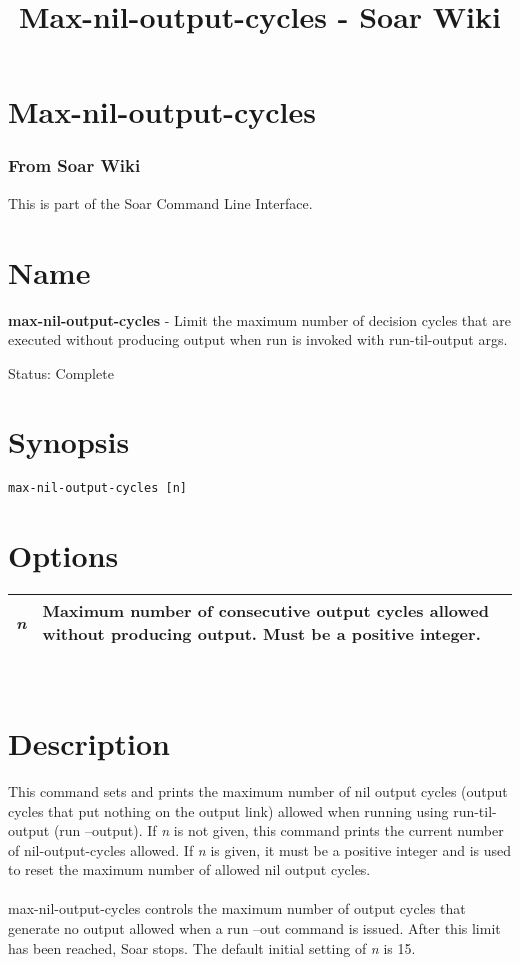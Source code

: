 \documentclass[10pt]{article}
\title{Max-nil-output-cycles - Soar Wiki}
\begin{document}
\section*{Max-nil-output-cycles}
\subsubsection*{From Soar Wiki}


 This is part of the Soar Command Line Interface. 
\section*{ Name }


 \textbf{max-nil-output-cycles}
 - Limit the maximum number of decision cycles that are executed without producing output when run is invoked with run-til-output args. 


 Status: Complete
\section*{ Synopsis }
\begin{verbatim}
max-nil-output-cycles [n]

\end{verbatim}
\section*{ Options }


\begin{tabular}{|p{1in}|p{5in}|}
\hline 
\emph{n}
 & Maximum number of consecutive output cycles allowed without producing output. Must be a positive integer.  \\
 \hline 

\end{tabular}



 \\ 

\section*{ Description }


 This command sets and prints the maximum number of nil output cycles (output cycles that put nothing on the output link) allowed when running using run-til-output (run --output). If \emph{n}
 is not given, this command prints the current number of nil-output-cycles allowed. If \emph{n}
 is given, it must be a positive integer and is used to reset the maximum number of allowed nil output cycles. \\ 
\\ 
max-nil-output-cycles controls the maximum number of output cycles that generate no output allowed when a run --out command is issued. After this limit has been reached, Soar stops. The default initial setting of \emph{n}
 is 15. 
\end{document}
